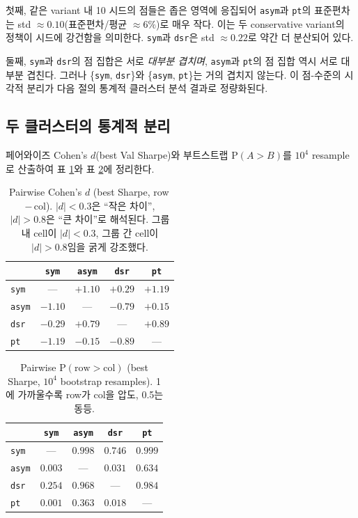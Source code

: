 \documentclass[11pt, a4paper]{article}
\begin{document}
첫째, 같은 variant 내 10 시드의 점들은 좁은 영역에 응집되어 \texttt{asym}과
\texttt{pt}의 표준편차는 std $\approx 0.10$(표준편차/평균 $\approx 6\%$)로 매우
작다. 이는 두 conservative variant의 정책이 시드에 강건함을 의미한다. \texttt{sym}과
\texttt{dsr}은 std $\approx 0.22$로 약간 더 분산되어 있다.

둘째, \texttt{sym}과 \texttt{dsr}의 점 집합은 서로 \emph{대부분 겹치며}, \texttt{asym}과
\texttt{pt}의 점 집합 역시 서로 대부분 겹친다. 그러나 \{\texttt{sym}, \texttt{dsr}\}와
\{\texttt{asym}, \texttt{pt}\}는 거의 겹치지 않는다. 이 점-수준의 시각적 분리가
다음 절의 통계적 클러스터 분석 결과로 정량화된다.

\subsection{두 클러스터의 통계적 분리}
\label{sec:pareto_clusters}

페어와이즈 Cohen's $d$(best Val Sharpe)와 부트스트랩 $\mathrm{P}(A > B)$를
$10^4$ resample로 산출하여 표 \ref{tab:pareto_cohens_d}와 표
\ref{tab:pareto_p_a_gt_b}에 정리한다.

\begin{table}[!htbp]
\centering
\caption{Pairwise Cohen's $d$ (best Sharpe, row\,$-$\,col). $|d| < 0.3$은 ``작은
차이'', $|d| > 0.8$은 ``큰 차이''로 해석된다. 그룹 내 cell이 $|d| < 0.3$, 그룹 간
cell이 $|d| > 0.8$임을 굵게 강조했다.}
\begin{tabular}{lcccc}
\toprule
 & \texttt{sym} & \texttt{asym} & \texttt{dsr} & \texttt{pt} \\
\midrule
\texttt{sym}  & ---   & $+\mathbf{1.10}$ & $+0.29$ & $+\mathbf{1.19}$ \\
\texttt{asym} & $-\mathbf{1.10}$ & ---   & $-0.79$ & $+0.15$ \\
\texttt{dsr}  & $-0.29$ & $+0.79$ & ---   & $+\mathbf{0.89}$ \\
\texttt{pt}   & $-\mathbf{1.19}$ & $-0.15$ & $-\mathbf{0.89}$ & ---   \\
\bottomrule
\end{tabular}
\label{tab:pareto_cohens_d}
\end{table}

\begin{table}[!htbp]
\centering
\caption{Pairwise $\mathrm{P}(\text{row} > \text{col})$ (best Sharpe,
$10^4$ bootstrap resamples). 1에 가까울수록 row가 col을 압도, 0.5는 동등.}
\begin{tabular}{lcccc}
\toprule
 & \texttt{sym} & \texttt{asym} & \texttt{dsr} & \texttt{pt} \\
\midrule
\texttt{sym}  & ---   & $0.998$ & $0.746$ & $0.999$ \\
\texttt{asym} & $0.003$ & ---   & $0.031$ & $0.634$ \\
\texttt{dsr}  & $0.254$ & $0.968$ & ---   & $0.984$ \\
\texttt{pt}   & $0.001$ & $0.363$ & $0.018$ & ---   \\
\bottomrule
\end{tabular}
\label{tab:pareto_p_a_gt_b}
\end{table}
\end{document}
